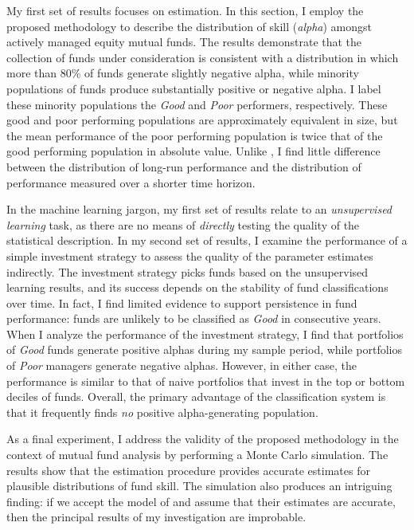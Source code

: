 	My first set of results focuses on estimation. In this section, I employ the proposed methodology to describe the distribution of skill (\textit{alpha}) amongst actively managed equity mutual funds. The results demonstrate that the collection of funds under consideration is consistent with a distribution in which more than 80\% of funds generate slightly negative alpha, while minority populations of funds produce substantially positive or negative alpha. I label these minority populations the \textit{Good} and \textit{Poor} performers, respectively. These good and poor performing populations are approximately equivalent in size, but the mean performance of the poor performing population is twice that of the good performing population in absolute value. Unlike \citet{Barras2010}, I find little difference between the distribution of long-run performance and the distribution of performance measured over a shorter time horizon.

	In the machine learning jargon, my first set of results relate to an \textit{unsupervised learning} task, as there are no means of \textit{directly} testing the quality of the statistical description. In my second set of results, I examine the performance of a simple investment strategy to assess the quality of the parameter estimates indirectly. The investment strategy picks funds based on the unsupervised learning results, and its success depends on the stability of fund classifications over time. In fact, I find limited evidence to support persistence in fund performance: funds are unlikely to be classified as \textit{Good} in consecutive years. When I analyze the performance of the investment strategy, I find that portfolios of \textit{Good} funds generate positive alphas during my sample period, while portfolios of \textit{Poor} managers generate negative alphas. However, in either case, the performance is similar to that of naive portfolios that invest in the top or bottom deciles of funds. Overall, the primary advantage of the classification system is that it frequently finds \textit{no} positive alpha-generating population.

	As a final experiment, I address the validity of the proposed methodology in the context of mutual fund analysis by performing a Monte Carlo simulation. The results show that the estimation procedure provides accurate estimates for plausible distributions of fund skill. The simulation also produces an intriguing finding: if we accept the model of \citet{Barras2010} and assume that their estimates are accurate, then the principal results of my investigation are improbable.

